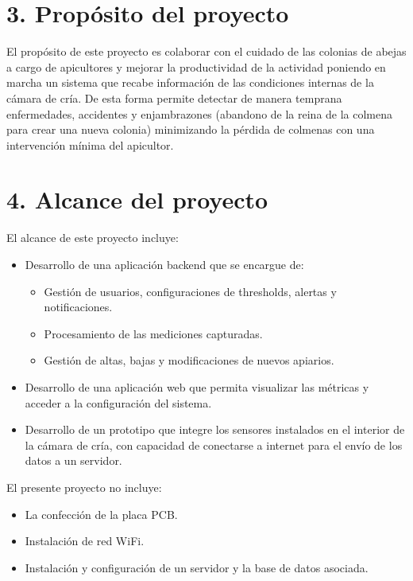 \documentclass[
11pt, %
codirector, %
]{charter}
\begin{document}
\section{3. Propósito del proyecto}
\label{sec:proposito}

El propósito de este proyecto es colaborar con el cuidado de las colonias de abejas a cargo de apicultores y mejorar la productividad de la actividad poniendo en marcha un sistema que recabe información de las condiciones internas de la cámara de cría. De esta forma permite detectar de manera temprana enfermedades, accidentes y enjambrazones (abandono de la reina de la colmena para crear una nueva colonia)  minimizando la pérdida de colmenas con una intervención mínima del apicultor.

\section{4. Alcance del proyecto}
\label{sec:alcance}

El alcance de este proyecto incluye: 
\begin{itemize}
\item Desarrollo de una aplicación backend que se encargue de:
	\begin{itemize}
	\item Gestión de usuarios, configuraciones de thresholds, alertas y notificaciones.
	\item Procesamiento de las mediciones capturadas.
	\item Gestión de altas, bajas y modificaciones de nuevos apiarios.
	\end{itemize}
\item Desarrollo de una aplicación web que permita visualizar las métricas y acceder a la configuración del sistema.
\item Desarrollo de un prototipo que integre los sensores instalados en el interior de la cámara de cría, con capacidad de conectarse a internet para el envío de los datos a un servidor.
\end{itemize}

El presente proyecto no incluye:

\begin{itemize}
\item La confección de la placa PCB.
\item Instalación de red WiFi.
\item Instalación y configuración de un servidor y la base de datos asociada.
\end{itemize}
\end{document}
